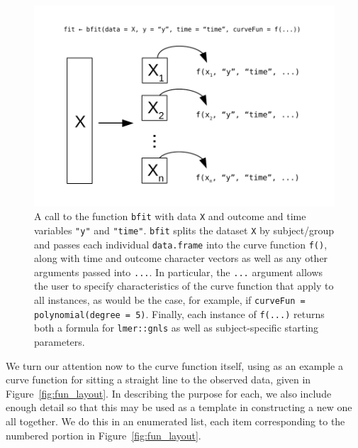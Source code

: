 \documentclass{article}
\newcommand{\xt}{\texttt}%
\begin{document}
\begin{figure}
\centering
\includegraphics{img/curve_split.pdf}
\caption{A call to the function \xt{bfit} with data \xt{X} and outcome and time variables \xt{"y"} and \xt{"time"}. \xt{bfit} splits the dataset \xt{X} by subject/group and passes each individual \xt{data.frame} into the curve function \xt{f()}, along with time and outcome character vectors as well as any other arguments passed into \xt{...}. In particular, the \xt{...} argument allows the user to specify characteristics of the curve function that apply to all instances, as would be the case, for example, if \xt{curveFun = polynomial(degree = 5)}. Finally, each instance of \xt{f(...)} returns both a formula for \xt{lmer::gnls} as well as subject-specific starting parameters.}
\label{fig:curve_split}
\end{figure}

We turn our attention now to the curve function itself, using as an example a curve function for sitting a straight line to the observed data, given in Figure~\ref{fig:fun_layout}. In describing the purpose for each, we also include enough detail so that this may be used as a template in constructing a new one all together. We do this in an enumerated list, each item corresponding to the numbered portion in Figure~\ref{fig:fun_layout}.
\end{document}
